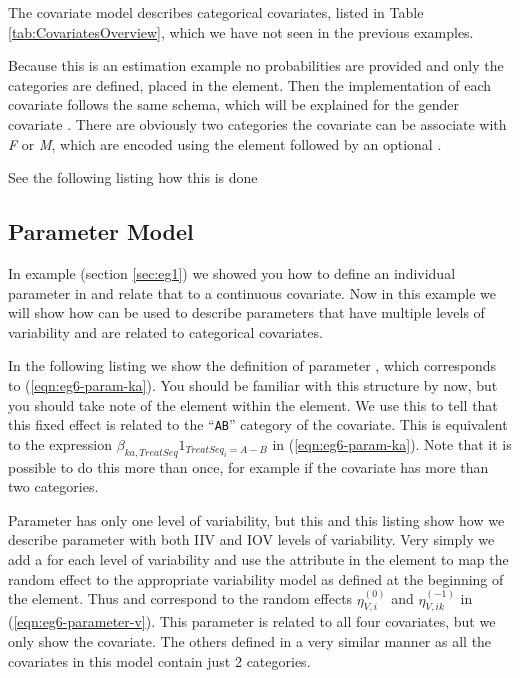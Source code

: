 The covariate model describes categorical covariates, listed in Table 
\ref{tab:CovariatesOverview}, which we have 
not seen in the previous examples. 

Because this is an estimation example no probabilities are provided and only the 
categories are defined, placed in the  element. 
Then the implementation of each covariate follows the same
schema, which will be explained for the gender covariate . 
There are obviously two categories the covariate can be associate with \textit{F} or \textit{M},
which are encoded using the  element followed by an optional
. 

See the following listing how this is done 



\subsection{Parameter Model}

In example  (section \ref{sec:eg1}) we showed you how to define an individual
parameter in \pharmml and relate that to a continuous covariate. Now
in this example we will show how \pharmml can be used to describe
parameters that have multiple levels of variability and are related to
categorical covariates.


In the following listing  we show the definition of
parameter , which corresponds to (\ref{eqn:eg6-param-ka}). You
should be familiar with this structure by now, but you should take
note of the  element within the 
element. We use this to tell \pharmml that this fixed effect is related
to the ``\texttt{AB}'' category of the  covariate. This
is equivalent to the expression
$\beta_{ka,TreatSeq}1_{TreatSeq_i=A-B}$ in
(\ref{eqn:eg6-param-ka}). Note that it is possible to do this more
than once, for example if the covariate has more than two categories.


Parameter  has only one level of variability, but this 
 and this listing 
show how we describe parameter
 with both IIV and IOV levels of variability. Very simply we
add a  for each level of variability and use
the  attribute in the  element 
to map the random effect to the appropriate variability model as defined at 
the beginning of the  element. 
Thus  and  correspond to the 
random effects $\eta^{(0)}_{V,i}$ and $\eta^{(-1)}_{V,ik}$ in
(\ref{eqn:eg6-parameter-v}). This parameter is related to all four
covariates, but we only show the  covariate. The others
defined in a very similar manner as all the covariates in this model
contain just 2 categories.

